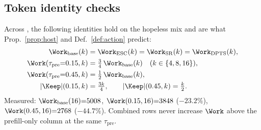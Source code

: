 \subsection{Token identity checks}
\label{sec:ablate-idents}

Across , the following identities hold on the hopeless mix
and are what Prop.~\ref{prop:host} and Def.~\ref{def:action} predict:
\begin{align}
\Work_{\mathrm{base}}(k)
  &= \Work_{\mathrm{ESC}}(k)
   = \Work_{\mathrm{SR}}(k)
   = \Work_{\mathrm{DPTS}}(k), \nonumber\\
\Work(\tau_{\mathrm{pre}}{=}0.15,k)
  &= \tfrac{3}{4}\,\Work_{\mathrm{base}}(k)
     \quad(k\in\{4,8,16\}), \nonumber\\
\Work(\tau_{\mathrm{pre}}{=}0.45,k)
  &= \tfrac{1}{2}\,\Work_{\mathrm{base}}(k), \nonumber\\
|\Keep|(0.15,k) &= \tfrac{3k}{4},\qquad
|\Keep|(0.45,k) = \tfrac{k}{2}. \nonumber
\end{align}
Measured: $\Work_{\mathrm{base}}(16){=}5008$,
$\Work(0.15,16){=}3848$ ($-23.2\%$),
$\Work(0.45,16){=}2768$ ($-44.7\%$).
Combined rows never increase $\Work$ above the prefill-only column at the same $\tau_{\mathrm{pre}}$.
